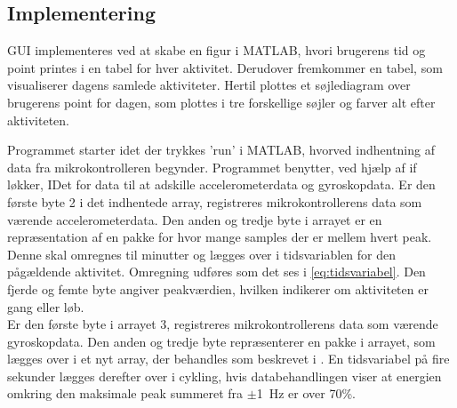 \subsection{Implementering}
GUI implementeres ved at skabe en figur i MATLAB, hvori brugerens tid og point printes i en tabel for hver aktivitet. Derudover fremkommer en tabel, som visualiserer dagens samlede aktiviteter. Hertil plottes et søjlediagram over brugerens point for dagen, som plottes i tre forskellige søjler og farver alt efter aktiviteten. %

Programmet starter idet der trykkes 'run' i MATLAB, hvorved indhentning af data fra mikrokontrolleren begynder. Programmet benytter, ved hjælp af if løkker, IDet for data til at adskille accelerometerdata og gyroskopdata. Er den første byte 2 i det indhentede array, registreres mikrokontrollerens data som værende accelerometerdata. Den anden og tredje byte i arrayet er en repræsentation af en pakke for hvor mange samples der er mellem hvert peak. Denne skal omregnes til minutter og lægges over i tidsvariablen for den pågældende aktivitet. Omregning udføres som det ses i \eqref{eq:tidsvariabel}. Den fjerde og femte byte angiver peakværdien, hvilken indikerer om aktiviteten er gang eller løb. \\
Er den første byte i arrayet 3, registreres mikrokontrollerens data som værende gyroskopdata. Den anden og tredje byte repræsenterer en pakke i arrayet, som lægges over i et nyt array, der behandles som beskrevet i . En tidsvariabel på fire sekunder lægges derefter over i cykling, hvis databehandlingen viser at energien omkring den maksimale peak summeret fra $\pm$1~Hz er over 70\%.  
